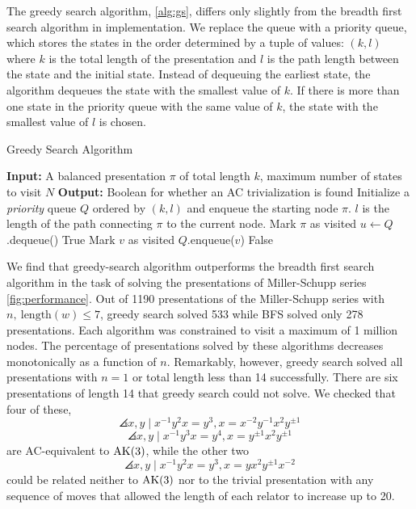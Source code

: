 The greedy search algorithm, \autoref{alg:gs}, differs only slightly from the breadth first search algorithm in implementation. We replace the queue with a priority queue, which stores the states in the order determined by a tuple of values: $(k, l)$ where $k$ is the total length of the presentation and $l$ is the path length between the state and the initial state. Instead of dequeuing the earliest state, the algorithm dequeues the state with the smallest value of $k$. If there is more than one state in the priority queue with the same value of $k$, the state with the smallest value of $l$ is chosen. 

\begin{algorithm}
\caption{Greedy Search Algorithm}\label{alg:gs}
\begin{algorithmic}[1] %
\State \textbf{Input:} A balanced presentation $\pi$ of total length $k$, maximum number of states to visit $N$
\State \textbf{Output:} Boolean for whether an AC trivialization is found
\State Initialize a \textit{priority} queue $Q$ ordered by $(k, l)$ and enqueue the starting node $\pi$. $l$ is the length of the path connecting $\pi$ to the current node.
\State Mark $\pi$ as visited
    \State $u \gets Q$.dequeue() 
            \State \Return True 
        \EndIf
            \State Mark $v$ as visited
            \State $Q$.enqueue($v$) 
        \EndIf
    \EndFor
\EndWhile
\State \Return False 
\end{algorithmic}
\end{algorithm}

We find that greedy-search algorithm outperforms the breadth first search algorithm in the task of solving the presentations of Miller-Schupp series \autoref{fig:performance}. Out of 1190 presentations of the Miller-Schupp series with $n, \ \text{length}(w) \leq 7$, greedy search solved 533 while BFS solved only 278 presentations. Each algorithm was constrained to visit a maximum of 1 million nodes. The percentage of presentations solved by these algorithms decreases monotonically as a function of $n$. Remarkably, however, greedy search solved all presentations with $n=1$ or total length less than 14 successfully. There are six presentations of length 14 that greedy search could not solve. We checked that four of these,
\[
\angles{x, y \mid x^{-1} y^2 x = y^{3} , x = x^{-2} y^{-1} x^2 y^{\pm 1}}
\]
\[
\angles{x, y \mid x^{-1} y^3 x = y^{4} , x = y^{\pm 1} x^2 y^{\pm 1}}
\]
are AC-equivalent to $\text{AK}(3)$, while the other two
\[
\angles{x, y \mid x^{-1} y^2 x = y^{3} , x = y x^2 y^{\pm 1} x^{-2}}
\]
could be related neither to $\text{AK}(3)$ nor to the trivial presentation with any sequence of moves that allowed the length of each relator to increase up to 20. 
\newline 

